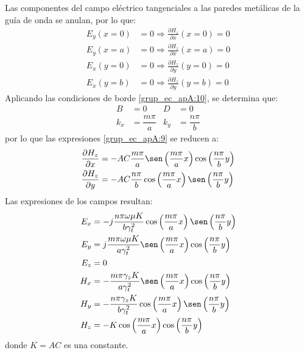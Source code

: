 Las componentes del campo eléctrico tangenciales a las paredes metálicas de la guía de onda se anulan, por lo que:
\begin{subequations}
\label{grup_ec_apA:10}
\begin{align}
E_y\left(x=0\right) &= 0\Longrightarrow\frac{\partial H_z}{\partial x}\left(x=0\right) = 0
\label{ec_apA:43}\\
E_y\left(x=a\right) &= 0\Longrightarrow\frac{\partial H_z}{\partial x}\left(x=a\right) = 0
\label{ec_apA:44}\\
E_x\left(y=0\right) &= 0\Longrightarrow\frac{\partial H_z}{\partial y}\left(y=0\right) = 0
\label{ec_apA:45}\\
E_x\left(y=b\right) &= 0\Longrightarrow\frac{\partial H_z}{\partial y}\left(y=b\right) = 0
\label{ec_apA:46}
\end{align}
\end{subequations}
Aplicando las condiciones de borde \eqref{grup_ec_apA:10}, se determina que:
\begin{subequations}
\label{grup_ec_apA:11}
\begin{align}
B &= 0 &D &= 0
\label{ec_apA:47}\\
k_x &= \dfrac{m\pi}{a} &k_y &= \dfrac{n\pi}{b}
\label{ec_apA:48}
\end{align}
\end{subequations}
por lo que las expresiones \eqref{grup_ec_apA:9} se reducen a:
\begin{subequations}
\label{grup_ec_apA:12}
\begin{align}
&\frac{\partial H_z}{\partial x} = -AC\frac{m\pi}{a}\sen\left(\frac{m\pi}{a}x\right)\cos\left(\frac{n\pi}{b}y\right)
\label{ec_apA:49}\\
&\frac{\partial H_z}{\partial y} = -AC\frac{n\pi}{b}\cos\left(\frac{m\pi}{a}x\right)\sen\left(\frac{n\pi}{b}y\right)
\label{ec_apA:50}
\end{align}
\end{subequations}
Las expresiones de los campos resultan:
\begin{subequations}
\label{grup_ec_apA:13}
\begin{align}
E_x &= -j\frac{n\pi\omega\mu K}{b\gamma_t^2}\cos\left(\frac{m\pi}{a}x\right)\sen\left(\frac{n\pi}{b}y\right)
\label{ec_apA:51}\\
E_y &= j\frac{m\pi\omega\mu K}{a\gamma_t^2}\sen\left(\frac{m\pi}{a}x\right)\cos\left(\frac{n\pi}{b}y\right)
\label{ec_apA:52}\\
E_z &= 0
\label{ec_apA:53}\\
H_x &= -\frac{m\pi\gamma_zK}{a\gamma_t^2}\sen\left(\frac{m\pi}{a}x\right)\cos\left(\frac{n\pi}{b}y\right)
\label{ec_apA:54}\\
H_y &= -\frac{n\pi\gamma_zK}{b\gamma_t^2}\cos\left(\frac{m\pi}{a}x\right)\sen\left(\frac{n\pi}{b}y\right)
\label{ec_apA:55}\\
H_z &= -K\cos\left(\frac{m\pi}{a}x\right)\cos\left(\frac{n\pi}{b}y\right)
\label{ec_apA:56}
\end{align}
\end{subequations}
donde $K = AC$ es una constante.

